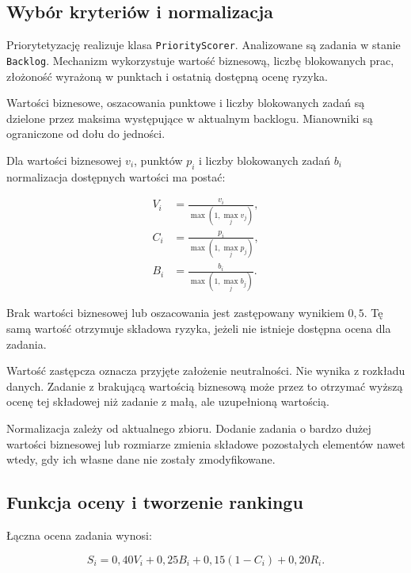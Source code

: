 \subsection{Wybór kryteriów i normalizacja}

Priorytetyzację realizuje klasa \texttt{PriorityScorer}. Analizowane są zadania w stanie \texttt{Backlog}. Mechanizm wykorzystuje wartość biznesową, liczbę blokowanych prac, złożoność wyrażoną w punktach i ostatnią dostępną ocenę ryzyka.

Wartości biznesowe, oszacowania punktowe i liczby blokowanych zadań są dzielone przez maksima występujące w aktualnym backlogu. Mianowniki są ograniczone od dołu do jedności.

Dla wartości biznesowej \(v_i\), punktów \(p_i\) i liczby blokowanych zadań \(b_i\) normalizacja dostępnych wartości ma postać:

\begin{align}
    V_i &= \frac{v_i}{\max(1,\max_j v_j)},\\
    C_i &= \frac{p_i}{\max(1,\max_j p_j)},\\
    B_i &= \frac{b_i}{\max(1,\max_j b_j)}.
    \label{eq:priorytet-normalizacja}
\end{align}

Brak wartości biznesowej lub oszacowania jest zastępowany wynikiem \(0{,}5\). Tę samą wartość otrzymuje składowa ryzyka, jeżeli nie istnieje dostępna ocena dla zadania.

Wartość zastępcza oznacza przyjęte założenie neutralności. Nie wynika z rozkładu danych. Zadanie z brakującą wartością biznesową może przez to otrzymać wyższą ocenę tej składowej niż zadanie z małą, ale uzupełnioną wartością.

Normalizacja zależy od aktualnego zbioru. Dodanie zadania o bardzo dużej wartości biznesowej lub rozmiarze zmienia składowe pozostałych elementów nawet wtedy, gdy ich własne dane nie zostały zmodyfikowane.

\subsection{Funkcja oceny i tworzenie rankingu}

Łączna ocena zadania wynosi:

\begin{equation}
    S_i =
    0{,}40V_i
    + 0{,}25B_i
    + 0{,}15(1-C_i)
    + 0{,}20R_i.
    \label{eq:priorytet-funkcja}
\end{equation}

